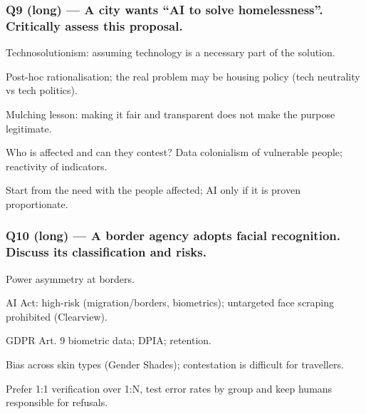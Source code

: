 \documentclass[11pt,a4paper]{article}
\newcommand{\blk}[1]{{\setlength{\fboxsep}{2pt}\colorbox{ink}{\sffamily\footnotesize\bfseries\color{white}\,#1\,}}}
\begin{document}
\subsubsection*{Q9 (long) — A city wants “AI to solve homelessness”. Critically assess this proposal.}
\begin{description}[leftmargin=1.2cm,style=sameline]
\item[\blk{F}] Technosolutionism: assuming technology is a necessary part of the solution.
\item[\blk{A1}] Post-hoc rationalisation; the real problem may be housing policy (tech neutrality vs tech politics).
\item[\blk{A2}] Mulching lesson: making it fair and transparent does not make the purpose legitimate.
\item[\blk{A3}] Who is affected and can they contest? Data colonialism of vulnerable people; reactivity of indicators.
\item[\blk{R}] Start from the need with the people affected; AI only if it is proven proportionate.
\end{description}
\subsubsection*{Q10 (long) — A border agency adopts facial recognition. Discuss its classification and risks.}
\begin{description}[leftmargin=1.2cm,style=sameline]
\item[\blk{F}] Power asymmetry at borders.
\item[\blk{A1}] AI Act: high-risk (migration/borders, biometrics); untargeted face scraping prohibited (Clearview).
\item[\blk{A2}] GDPR Art. 9 biometric data; DPIA; retention.
\item[\blk{A3}] Bias across skin types (Gender Shades); contestation is difficult for travellers.
\item[\blk{R}] Prefer 1:1 verification over 1:N, test error rates by group and keep humans responsible for refusals.
\end{description}
\end{document}

